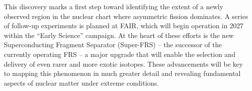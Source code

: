 This discovery marks a first step toward identifying the extent of a newly observed region in the nuclear chart where asymmetric fission dominates. A series of follow-up experiments is planned at FAIR, which will begin operation in 2027 within the ``Early Science'' campaign. At the heart of these efforts is the new Superconducting Fragment Separator (Super-FRS) -- the successor of the currently operating FRS -- a major upgrade that will enable the selection and delivery of even rarer and more exotic isotopes. These advancements will be key to mapping this phenomenon in much greater detail and revealing fundamental aspects of nuclear matter under extreme conditions.\newline

\clearpage

%
%
%
%
\newpage
